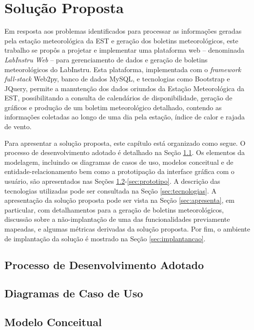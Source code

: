 \chapter{Solução Proposta} \label{cap:solucao}

Em resposta aos problemas identificados para processar as informações geradas pela estação meteorológica da EST e geração dos boletins meteorológicos, este trabalho se propôs a projetar e implementar uma plataforma web -- denominada \emph{LabInstru Web} -- para gerenciamento de dados e geração de boletins meteorológicos do LabInstru. Esta plataforma, implementada com o \emph{framework full-stack} Web2py, banco de dados MySQL, e tecnologias como Bootstrap e JQuery, permite a manutenção dos dados oriundos da Estação Meteorológica da EST, possibilitando a consulta de calendários de disponibilidade, geração de gráficos e produção de um boletim meteorológico detalhado, contendo as informações coletadas ao longo de uma dia pela estação, índice de calor e rajada de vento.

Para apresentar a solução proposta, este capítulo está organizado como segue. O processo de desenvolvimento adotado é detalhado na Seção \ref{sec:processoAdotado}. Os elementos da modelagem, incluindo os diagramas de casos de uso, modelos conceitual e de entidade-relacionamento bem como a prototipação da interface gráfica com o usuário, são apresentados nas Seções \ref{sec:casoUso}-\ref{sec:prototipo}. A descrição das tecnologias utilizadas pode ser consultada na Seção \ref{sec:tecnologias}. A apresentação da solução proposta pode ser vista na Seção \ref{sec:apresenta}, em particular, com  detalhamentos para a geração de boletins meteorológicos, discussão sobre a não-implantação de uma das funcionalidades previamente mapeadas, e algumas métricas derivadas da solução proposta. Por fim, o ambiente de implantação da solução é mostrado na Seção \ref{sec:implantancao}.


\section{Processo de Desenvolvimento Adotado} \label{sec:processoAdotado}


\section{Diagramas de Caso de Uso} \label{sec:casoUso}


\section{Modelo Conceitual}


